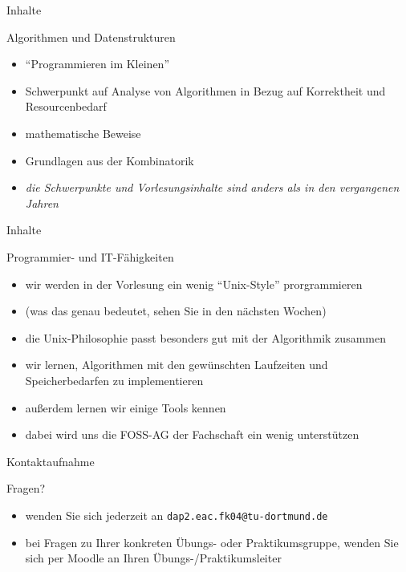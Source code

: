 \documentclass[aspectratio=1610, 11pt]{beamer}
\begin{document}
\begin{frame}{Inhalte}
	\begin{exampleblock}{Algorithmen und Datenstrukturen}
		\begin{itemize}
			\item ``Programmieren im Kleinen''
			\item Schwerpunkt auf Analyse von Algorithmen in Bezug auf Korrektheit und Resourcenbedarf
			\item mathematische Beweise
			\item Grundlagen aus der Kombinatorik
			\item \emph{die Schwerpunkte und Vorlesungsinhalte sind anders als in den vergangenen Jahren}
		\end{itemize}
	\end{exampleblock}
\end{frame}

\begin{frame}{Inhalte}
	\begin{exampleblock}{Programmier- und IT-F\"ahigkeiten}
		\begin{itemize}
			\item wir werden in der Vorlesung ein wenig ``Unix-Style'' prorgrammieren
			\item (was das genau bedeutet, sehen Sie in den n\"achsten Wochen)
			\item die Unix-Philosophie passt besonders gut mit der Algorithmik zusammen
			\item wir lernen, Algorithmen mit den gew\"unschten Laufzeiten und Speicherbedarfen zu implementieren
			\item au\ss erdem lernen wir einige Tools kennen
			\item dabei wird uns die FOSS-AG der Fachschaft ein wenig unterst\"utzen
		\end{itemize}
	\end{exampleblock}
\end{frame}

\begin{frame}{Kontaktaufnahme}
	\begin{exampleblock}{Fragen?}
		\begin{itemize}
		\item wenden Sie sich jederzeit an {\tt dap2.eac.fk04@tu-dortmund.de}
			\item bei Fragen zu Ihrer konkreten \"Ubungs- oder Praktikumsgruppe, wenden Sie sich per Moodle an Ihren \"Ubungs-/Praktikumsleiter
		\end{itemize}
	\end{exampleblock}
\end{frame}
\end{document}
